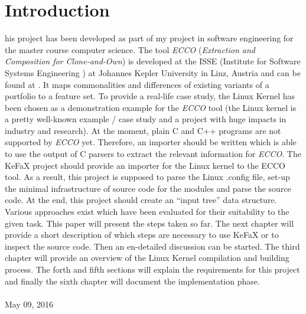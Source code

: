 \section{Introduction}
his project has been developed as part of my project in software engineering for the master course computer science.
The tool {\it ECCO}
({\it Extraction and Composition for Clone-and-Own})\cite{fischer2014enhancing}
is developed at the ISSE (Institute for Software Systems Engineering \cite{ISSE_URL})
at Johannes Kepler University in Linz, Austria 
and can be found at \cite{ecourl}.
It maps commonalities and differences of existing variants 
of a portfolio to a feature set.
To provide a real-life case study, the Linux Kernel has been chosen as a 
demonstration example for the {\it ECCO} tool 
(the Linux kernel is a pretty well-known example / case study 
and a project with huge impacts in industry and research).
At the moment, plain C and C++ programs are not supported by {\it ECCO} yet.
Therefore, an importer should be written which is
able to use the output of C parsers to extract the relevant information
for {\it ECCO}. 
The  KeFaX project should provide an importer for the Linux kernel to the ECCO tool. 
As a result,
this project is supposed to parse the Linux .config file, 
set-up the minimal infrastructure of source code for the modules and 
parse the source code. At the end, this project should create an ``input tree'' data
structure. 
Various approaches exist which have been evaluated
for their suitability to the given task. 
This paper will present the steps taken so far. 
The next chapter will provide a short description of which steps are necessary
to use KeFaX or to inspect the source code.
Then an en-detailed discussion can be started.
The third chapter will provide
an overview of the Linux Kernel compilation and building process.
The forth and fifth sections will explain the requirements for this project
and finally the sixth chapter will document the implementation phase.
\\ \ \\
\hfill May 09, 2016
